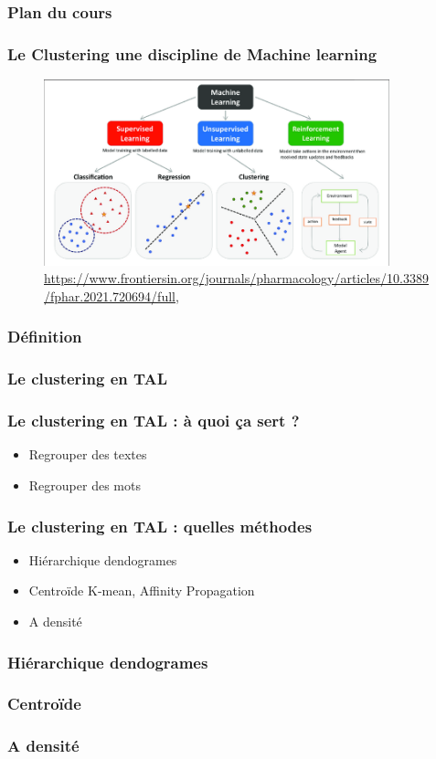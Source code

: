\begin{frame}
  \frametitle{Plan du cours}
\tableofcontents

\end{frame}

\begin{frame}
  \frametitle{Le Clustering une discipline de Machine learning}

 \begin{figure}
  \includegraphics[width=10cm]{images/The-main-types-of-machine-learning-Main-approaches-include-classification-and.png}
  \caption{\url{https://www.frontiersin.org/journals/pharmacology/articles/10.3389/fphar.2021.720694/full}, \cite{10.3389/fphar.2021.720694}}
  \end{figure}
\end{frame}

\begin{frame}
  \frametitle{Définition }


\end{frame}

\begin{frame}
  \frametitle{Le clustering en TAL}


\end{frame}

\begin{frame}
  \frametitle{Le clustering en TAL : à quoi ça sert ?}
  
  \begin{itemize}
  \item Regrouper des textes
  \item Regrouper des mots 
  \end{itemize}


\end{frame}

\begin{frame}
  \frametitle{Le clustering en TAL : quelles méthodes}

  \begin{itemize}
  \item Hiérarchique dendogrames
  \item Centroïde K-mean, Affinity Propagation
  \item A densité
  \end{itemize}
  
\end{frame}

\begin{frame}
  \frametitle{Hiérarchique dendogrames}

  
\end{frame}

\begin{frame}
  \frametitle{Centroïde}


  
\end{frame}

\begin{frame}
  \frametitle{A densité}


  
\end{frame}
